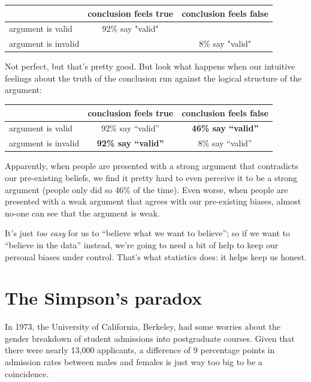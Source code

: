 \documentclass[
  11pt,
]{book}
\theoremstyle{definition}
\theoremstyle{definition}
\theoremstyle{definition}
\theoremstyle{definition}
\theoremstyle{remark}
\begin{document}
\begin{table}[H]
\centering
\begin{tabular}{lcc}
\toprule
  & conclusion feels true & conclusion feels false\\
\midrule
argument is valid & 92\% say "valid" & \\
argument is invalid &  & 8\% say "valid"\\
\bottomrule
\end{tabular}
\end{table}

Not perfect, but that's pretty good. But look what happens when our intuitive feelings about the truth of the conclusion run against the logical structure of the argument:

\begin{longtable}[]{@{}lcc@{}}
\toprule()
& conclusion feels true & conclusion feels false \\
\midrule()
\endhead
argument is valid & 92\% say ``valid'' & \textbf{46\% say ``valid''} \\
argument is invalid & \textbf{92\% say ``valid''} & 8\% say ``valid'' \\
\bottomrule()
\end{longtable}

Apparently, when people are presented with a strong argument that contradicts our pre-existing beliefs, we find it pretty hard to even perceive it to be a strong argument (people only did so 46\% of the time). Even worse, when people are presented with a weak argument that agrees with our pre-existing biases, almost no-one can see that the argument is weak.

It's just \emph{too easy} for us to ``believe what we want to believe''; so if we want to ``believe in the data'' instead, we're going to need a bit of help to keep our personal biases under control. That's what statistics does: it helps keep us honest.

\pagebreak[3]

\hypertarget{the-simpsons-paradox}{%
\section{The Simpson's paradox}\label{the-simpsons-paradox}}

In 1973, the University of California, Berkeley, had some worries about the gender breakdown of student admissions into postgraduate courses. Given that there were nearly 13,000 applicants, a difference of 9 percentage points in admission rates between males and females is just way too big to be a coincidence.
\end{document}

